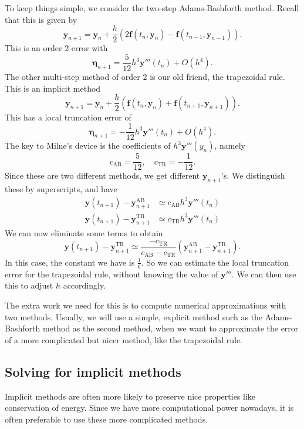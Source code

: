 \documentclass[a4paper]{article}
\begin{document}
To keep things simple, we consider the two-step Adams-Bashforth method. Recall that this is given by
\[
  \mathbf{y}_{n + 1} = \mathbf{y}_n + \frac{h}{2} (2 \mathbf{f}(t_n, \mathbf{y}_n) - \mathbf{f}(t_{n - 1}, \mathbf{y}_{n - 1})).
\]
This is an order $2$ error with
\[
  \boldsymbol\eta_{n + 1} = \frac{5}{12}h^3 \mathbf{y}'''(t_n) + O(h^4).
\]
The other multi-step method of order $2$ is our old friend, the trapezoidal rule. This is an implicit method
\[
  \mathbf{y}_{n + 1} = \mathbf{y}_n + \frac{h}{2} (\mathbf{f}(t_n, \mathbf{y}_n) + \mathbf{f}(t_{n + 1}, \mathbf{y}_{n + 1})).
\]
This has a local truncation error of
\[
  \boldsymbol\eta_{n + 1} = -\frac{1}{12}h^3 \mathbf{y}'''(t_n) + O(h^4).
\]
The key to Milne's device is the coefficients of $h^3 \mathbf{y}'''(y_n)$, namely
\[
  c_{\mathrm{AB}} = \frac{5}{12},\quad c_{\mathrm{TR}} = -\frac{1}{12}.
\]
Since these are two different methods, we get different $\mathbf{y}_{n + 1}$'s. We distinguish these by superscripts, and have
\begin{align*}
  \mathbf{y}(t_{n + 1}) - \mathbf{y}_{n + 1}^{\mathrm{AB}} &\simeq c_{\mathrm{AB}} h^3 \mathbf{y}'''(t_n)\\
  \mathbf{y}(t_{n + 1}) - \mathbf{y}_{n + 1}^{\mathrm{TR}} &\simeq c_{\mathrm{TR}} h^3 \mathbf{y}'''(t_n)
\end{align*}
We can now eliminate some terms to obtain
\[
  \mathbf{y}(t_{n + 1}) - \mathbf{y}_{n + 1}^{\mathrm{TR}} \simeq \frac{-c_{\mathrm{TR}}}{c_{\mathrm{AB}} - c_{\mathrm{TR}}} (\mathbf{y}_{n + 1}^{\mathrm{AB}} - \mathbf{y}_{n + 1}^{\mathrm{TR}}).
\]
In this case, the constant we have is $\frac{1}{6}$. So we can estimate the local truncation error for the trapezoidal rule, without knowing the value of $\mathbf{y}'''$. We can then use this to adjust $h$ accordingly.

The extra work we need for this is to compute numerical approximations with two methods. Usually, we will use a simple, explicit method such as the Adams-Bashforth method as the second method, when we want to approximate the error of a more complicated but nicer method, like the trapezoidal rule.

\subsection{Solving for implicit methods}
Implicit methods are often more likely to preserve nice properties like conservation of energy. Since we have more computational power nowadays, it is often preferable to use these more complicated methods.
\end{document}
